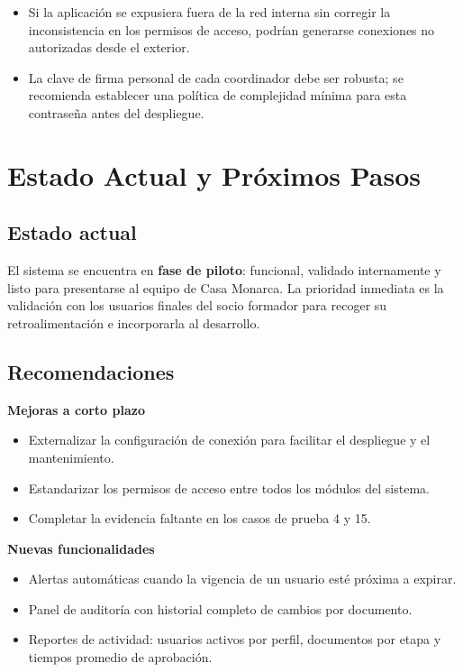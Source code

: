 \documentclass[10pt,letterpaper]{report}
\begin{document}
\begin{itemize}[noitemsep]
  \item Si la aplicación se expusiera fuera de la red interna sin corregir la inconsistencia en los permisos de acceso, podrían generarse conexiones no autorizadas desde el exterior.
  \item La clave de firma personal de cada coordinador debe ser robusta; se recomienda establecer una política de complejidad mínima para esta contraseña antes del despliegue.
\end{itemize}

\chapter{Estado Actual y Próximos Pasos}

\section{Estado actual}

El sistema se encuentra en \textbf{fase de piloto}: funcional, validado internamente y listo para presentarse al equipo de Casa Monarca. La prioridad inmediata es la validación con los usuarios finales del socio formador para recoger su retroalimentación e incorporarla al desarrollo.

\section{Recomendaciones}

\textbf{Mejoras a corto plazo}
\begin{itemize}[noitemsep]
  \item Externalizar la configuración de conexión para facilitar el despliegue y el mantenimiento.
  \item Estandarizar los permisos de acceso entre todos los módulos del sistema.
  \item Completar la evidencia faltante en los casos de prueba 4 y 15.
\end{itemize}

\textbf{Nuevas funcionalidades}
\begin{itemize}[noitemsep]
  \item Alertas automáticas cuando la vigencia de un usuario esté próxima a expirar.
  \item Panel de auditoría con historial completo de cambios por documento.
  \item Reportes de actividad: usuarios activos por perfil, documentos por etapa y tiempos promedio de aprobación.
\end{itemize}
\end{document}
